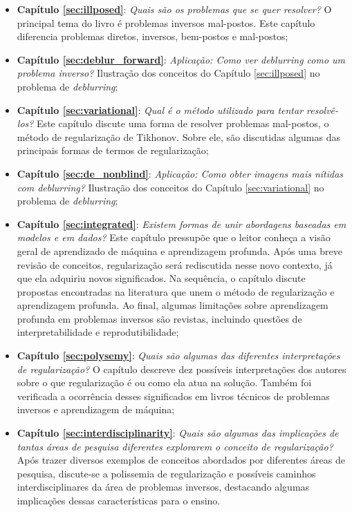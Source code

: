 \begin{itemize}
\item \textbf{Capítulo \ref{sec:illposed}}: \textit{Quais são os problemas que se quer resolver?} O principal tema do livro é problemas inversos mal-postos. Este capítulo diferencia problemas diretos, inversos, bem-postos e mal-postos;
\item \textbf{Capítulo \ref{sec:deblur_forward}}: \textit{Aplicação: Como ver deblurring como um problema inverso?} Ilustração dos conceitos do Capítulo \ref{sec:illposed} no problema de \textit{deblurring};
\item \textbf{Capítulo \ref{sec:variational}}: \textit{Qual é o método utilizado para tentar resolvê-los?} Este capítulo discute uma forma de resolver problemas mal-postos, o método de regularização de Tikhonov. Sobre ele, são discutidas algumas das principais formas de termos de regularização;
\item \textbf{Capítulo \ref{sec:de_nonblind}}: \textit{Aplicação: Como obter imagens mais nítidas com deblurring?} Ilustração dos conceitos do Capítulo \ref{sec:variational} no problema de \textit{deblurring};
 \item \textbf{Capítulo \ref{sec:integrated}}: \textit{Existem formas de unir abordagens baseadas em modelos e em dados?}  Este capítulo pressupõe que o leitor conheça a visão geral de aprendizado de máquina e aprendizagem profunda. Após uma breve revisão de conceitos, regularização será rediscutida nesse novo contexto, já que ela adquiriu novos significados. Na sequência, o capítulo discute propostas encontradas na literatura que unem o método de regularização e aprendizagem profunda. Ao final, algumas limitações sobre aprendizagem profunda em problemas inversos são revistas, incluindo questões de interpretabilidade e reprodutibilidade;
\item \textbf{Capítulo \ref{sec:polysemy}}: \textit{Quais são algumas das diferentes interpretações de regularização?}  O capítulo descreve dez possíveis interpretações dos autores sobre o que regularização é ou como ela atua na solução. Também foi verificada a ocorrência desses significados em livros técnicos de problemas inversos e aprendizagem de máquina;
\item \textbf{Capítulo \ref{sec:interdisciplinarity}}: \textit{Quais são algumas das implicações de tantas áreas de pesquisa diferentes explorarem o conceito de regularização?} Após trazer diversos exemplos de conceitos abordados por diferentes áreas de pesquisa, discute-se a polissemia de regularização e possíveis caminhos interdisciplinares da área de problemas inversos, destacando algumas implicações dessas características para o ensino. 
\end{itemize}


